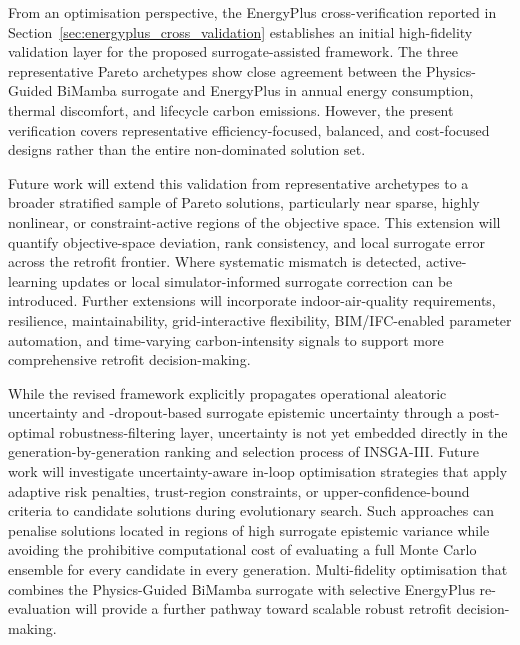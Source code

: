 \documentclass[11pt]{article}
\providecommand{\MC}{\text{MC}}
\begin{document}
From an optimisation perspective, the EnergyPlus cross-verification reported in Section~\ref{sec:energyplus_cross_validation} establishes an initial high-fidelity validation layer for the proposed surrogate-assisted framework. The three representative Pareto archetypes show close agreement between the Physics-Guided BiMamba surrogate and EnergyPlus in annual energy consumption, thermal discomfort, and lifecycle carbon emissions. However, the present verification covers representative efficiency-focused, balanced, and cost-focused designs rather than the entire non-dominated solution set.

Future work will extend this validation from representative archetypes to a broader stratified sample of Pareto solutions, particularly near sparse, highly nonlinear, or constraint-active regions of the objective space. This extension will quantify objective-space deviation, rank consistency, and local surrogate error across the retrofit frontier. Where systematic mismatch is detected, active-learning updates or local simulator-informed surrogate correction can be introduced. Further extensions will incorporate indoor-air-quality requirements, resilience, maintainability, grid-interactive flexibility, BIM/IFC-enabled parameter automation, and time-varying carbon-intensity signals to support more comprehensive retrofit decision-making.

While the revised framework explicitly propagates operational aleatoric uncertainty and \MC-dropout-based surrogate epistemic uncertainty through a post-optimal robustness-filtering layer, uncertainty is not yet embedded directly in the generation-by-generation ranking and selection process of INSGA-III. Future work will investigate uncertainty-aware in-loop optimisation strategies that apply adaptive risk penalties, trust-region constraints, or upper-confidence-bound criteria to candidate solutions during evolutionary search. Such approaches can penalise solutions located in regions of high surrogate epistemic variance while avoiding the prohibitive computational cost of evaluating a full Monte Carlo ensemble for every candidate in every generation. Multi-fidelity optimisation that combines the Physics-Guided BiMamba surrogate with selective EnergyPlus re-evaluation will provide a further pathway toward scalable robust retrofit decision-making.
\end{document}
